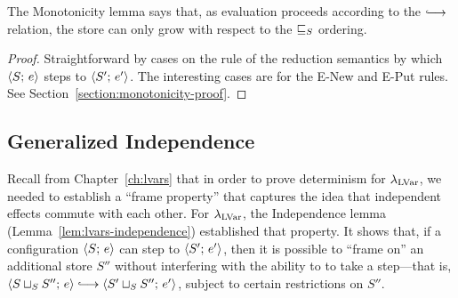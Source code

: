 The Monotonicity lemma says that, as evaluation proceeds according to
the $\parstepsto$ relation, the store can only grow with respect to
the $ \sqsubseteq_S $ ordering.

\LemMonotonicity
\begin{proof}
  Straightforward by cases on the rule of the reduction semantics by
  which $\langle S;\, e \rangle$ steps to $\langle S';\, e' \rangle$. The interesting
  cases are for the {\sc E-New} and {\sc E-Put} rules.  See
  Section~\ref{section:monotonicity-proof}.
\end{proof}

\subsection{Generalized Independence}\label{subsection:quasi-generalized-independence}

Recall from Chapter~\ref{ch:lvars} that in order to prove determinism
for $\lambda_{\textrm{LVar}}$, we needed to establish a ``frame property'' that
captures the idea that independent effects commute with each other.
For $\lambda_{\textrm{LVar}}$, the Independence lemma
(Lemma~\ref{lem:lvars-independence}) established that property.  It
shows that, if a configuration $\langle S;\, e \rangle$ can step to
$\langle S';\, e' \rangle$, then it is possible to ``frame on'' an additional
store $S''$ without interfering with the ability to to take a
step---that is, $\config{\lubstore{S}{S''}}{e} \parstepsto
\config{\lubstore{S'}{S''}}{e'}$, subject to certain restrictions on
$S''$.

